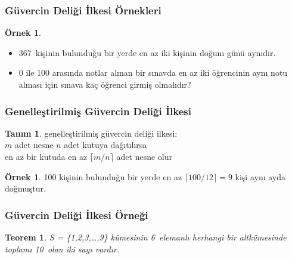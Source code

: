 \documentclass[dvipsnames]{beamer}
\theoremstyle{definition}
\newtheorem{tanim}[theorem]{Tanım}
\theoremstyle{example}
\newtheorem{ornek}[theorem]{Örnek}
\theoremstyle{plain}
\newtheorem{teorem}[theorem]{Teorem}
\begin{document}
\begin{frame}
  \frametitle{Güvercin Deliği İlkesi Örnekleri}

  \begin{ornek}
    \begin{itemize}
      \item 367~kişinin bulunduğu bir yerde en az iki kişinin doğum günü
        aynıdır.

      \pause
      \item 0 ile 100 arasında notlar alınan bir sınavda en az iki öğrencinin
        aynı notu alması için sınava kaç öğrenci girmiş olmalıdır?
    \end{itemize}
  \end{ornek}
\end{frame}

\begin{frame}
  \frametitle{Genelleştirilmiş Güvercin Deliği İlkesi}

  \begin{tanim}
    \alert{genelleştirilmiş güvercin deliği ilkesi}:\\
    $m$ adet nesne $n$ adet kutuya dağıtılırsa\\
    en az bir kutuda en az $\lceil m / n \rceil$ adet nesne olur
  \end{tanim}

  \pause
  \begin{ornek}
    100 kişinin bulunduğu bir yerde en az $\lceil 100 / 12 \rceil = 9$ kişi
    aynı ayda doğmuştur.
  \end{ornek}
\end{frame}

\begin{frame}
  \frametitle{Güvercin Deliği İlkesi Örneği}

  \begin{teorem}
    S = \{1,2,3,\dots,9\} kümesinin 6~elemanlı herhangi bir altkümesinde
    toplamı 10~olan iki sayı vardır.
  \end{teorem}
\end{frame}
\end{document}
